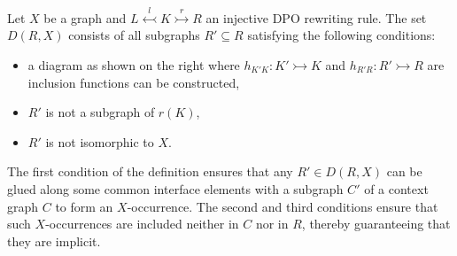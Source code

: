 \begin{definition}
    \label{subgraph_counting:def:rx}
    Let \(X\) be a graph and 
    \(
        L \overset{l}{\leftarrowtail} K \overset{r}{\rightarrowtail} R
    \) an injective DPO rewriting rule.
    The set \(D(R,X)\) consists of all subgraphs \( R' \subseteq R \)
    satisfying the following conditions:
    \newline
    \noindent
    \begin{minipage}{0.69\textwidth}\setlength{\parindent}{1em}
    \begin{itemize}
        \item a diagram as shown on the right where \(h_{K'K} \colon K' \rightarrowtail K \) and \(h_{R'R} \colon R' \rightarrowtail R \) are inclusion functions can be constructed,
        \item $R'$ is not a subgraph of $r(K)$,
        \item $R'$ is not isomorphic to $X$.
    \end{itemize}
    \end{minipage}
    \begin{minipage}{0.29\textwidth}
        \hfill
    \end{minipage}
\end{definition}  
The first condition of the definition ensures that any $R' \in D(R,X)$ can be glued along some common interface elements with a subgraph $C'$ of a context graph \( C \) to form an \( X \)-occurrence. The second and third conditions ensure that such $X$-occurrences are included neither in \( C \) nor in \( R \), thereby guaranteeing that they are implicit.

